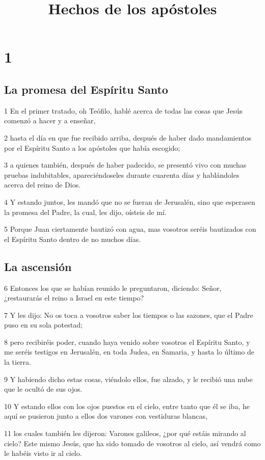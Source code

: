 
\title{Hechos de los apóstoles}

\chapter{1}

\section*{La promesa del Espíritu Santo}

\par 1 En el primer tratado, oh Teófilo, hablé acerca de todas las cosas que Jesús comenzó a hacer y a enseñar,
\par 2 hasta el día en que fue recibido arriba, después de haber dado mandamientos por el Espíritu Santo a los apóstoles que había escogido;
\par 3 a quienes también, después de haber padecido, se presentó vivo con muchas pruebas indubitables, apareciéndoseles durante cuarenta días y hablándoles acerca del reino de Dios.
\par 4 Y estando juntos, les mandó que no se fueran de Jerusalén, sino que esperasen la promesa del Padre, la cual, les dijo, oísteis de mí.
\par 5 Porque Juan ciertamente bautizó con agua, mas vosotros seréis bautizados con el Espíritu Santo dentro de no muchos días.

\section*{La ascensión}

\par 6 Entonces los que se habían reunido le preguntaron, diciendo: Señor, ¿restaurarás el reino a Israel en este tiempo?
\par 7 Y les dijo: No os toca a vosotros saber los tiempos o las sazones, que el Padre puso en su sola potestad;
\par 8 pero recibiréis poder, cuando haya venido sobre vosotros el Espíritu Santo, y me seréis testigos en Jerusalén, en toda Judea, en Samaria, y hasta lo último de la tierra.
\par 9 Y habiendo dicho estas cosas, viéndolo ellos, fue alzado, y le recibió una nube que le ocultó de sus ojos.
\par 10 Y estando ellos con los ojos puestos en el cielo, entre tanto que él se iba, he aquí se pusieron junto a ellos dos varones con vestiduras blancas,
\par 11 los cuales también les dijeron: Varones galileos, ¿por qué estáis mirando al cielo? Este mismo Jesús, que ha sido tomado de vosotros al cielo, así vendrá como le habéis visto ir al cielo.

